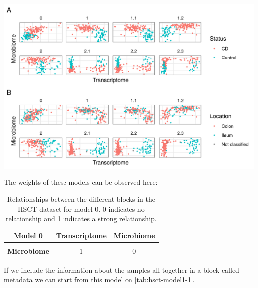 \documentclass[
  12pt,
  a4paper,
  twoside,
  openright]{book}
\let\origfigure\figure
\let\endorigfigure\endfigure
\renewenvironment{figure}[1][2] {
    \expandafter\origfigure\expandafter[!htbp]
} {
    \endorigfigure
}
\begin{document}
\begin{figure}
\includegraphics[width=1\linewidth]{images/hsct-models} \caption[Models in the HSCT dataset.]{Models in the HSCT dataset. On the abscissa the transcriptome, on the ordinate the Microbiome. Each square represents a different model of the HSCT dataset. On panel A colored by disease status, on panel B colored by sample location. Model 0 has only transcriptome and microbiome data, models 1 to 1.2 with data about the samples and models 2.1 to 2.3 with data about the samples split in 3 blocks.}\label{fig:hsct-models}
\end{figure}

The weights of these models can be observed here:

\begin{table}[H]

\caption[Model 0 of the HSCT dataset.]{\label{tab:hsct-model0}Relationships between the different blocks in the HSCT dataset for model 0. 0 indicates no relationship and 1 indicates a strong relationship.}
\centering
\begin{tabular}[t]{>{}c|c|c}
\hline
\textbf{Model 0} & \textbf{Transcriptome} & \textbf{Microbiome}\\
\hline
\textbf{\cellcolor{gray!6}{Transcriptome}} & \cellcolor{gray!6}{0} & \cellcolor{gray!6}{1}\\
\hline
\textbf{Microbiome} & 1 & 0\\
\hline
\end{tabular}
\end{table}

If we include the information about the samples all together in a block called metadata we can start from this model on \ref{tab:hsct-model1-1}.
\end{document}
